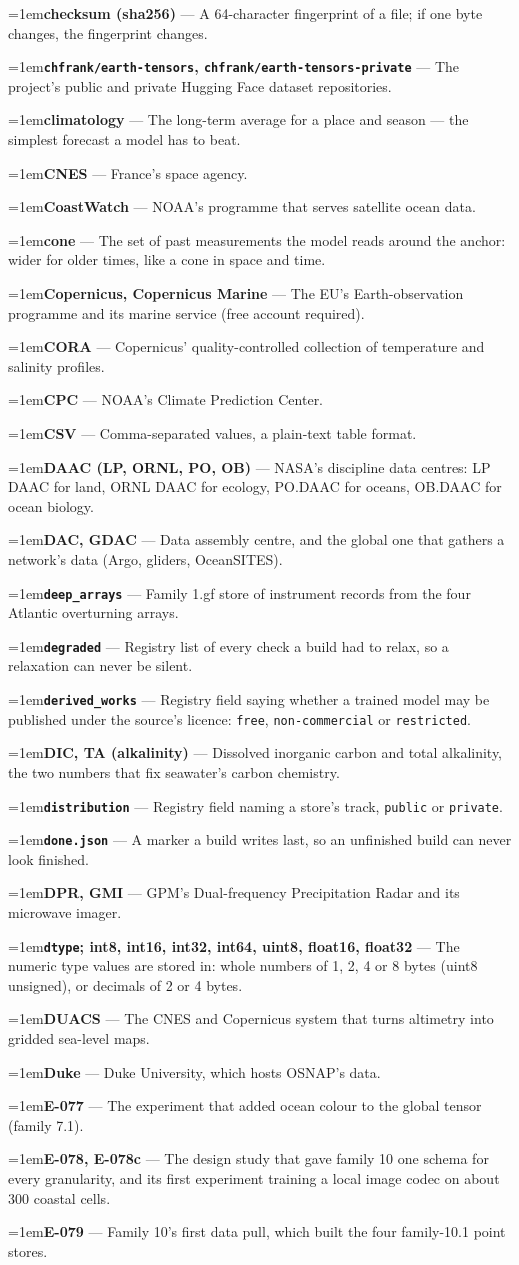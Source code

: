 \documentclass[10pt]{article}
\newcommand{\code}[1]{\texttt{#1}}
\newcommand{\gl}[2]{\par\hangindent=1em\hangafter=1\textbf{#1} --- #2\par}
\begin{document}
\gl{checksum (sha256)}{A 64-character fingerprint of a file; if one byte changes, the fingerprint changes.}
\gl{\code{chfrank/earth-tensors}, \code{chfrank/earth-tensors-private}}{The project's public and private Hugging Face dataset repositories.}
\gl{climatology}{The long-term average for a place and season --- the simplest forecast a model has to beat.}
\gl{CNES}{France's space agency.}
\gl{CoastWatch}{NOAA's programme that serves satellite ocean data.}
\gl{cone}{The set of past measurements the model reads around the anchor: wider for older times, like a cone in space and time.}
\gl{Copernicus, Copernicus Marine}{The EU's Earth-observation programme and its marine service (free account required).}
\gl{CORA}{Copernicus' quality-controlled collection of temperature and salinity profiles.}
\gl{CPC}{NOAA's Climate Prediction Center.}
\gl{CSV}{Comma-separated values, a plain-text table format.}
\gl{DAAC (LP, ORNL, PO, OB)}{NASA's discipline data centres: LP DAAC for land, ORNL DAAC for ecology, PO.DAAC for oceans, OB.DAAC for ocean biology.}
\gl{DAC, GDAC}{Data assembly centre, and the global one that gathers a network's data (Argo, gliders, OceanSITES).}
\gl{\code{deep\_arrays}}{Family 1.gf store of instrument records from the four Atlantic overturning arrays.}
\gl{\code{degraded}}{Registry list of every check a build had to relax, so a relaxation can never be silent.}
\gl{\code{derived\_works}}{Registry field saying whether a trained model may be published under the source's licence: \code{free}, \code{non-commercial} or \code{restricted}.}
\gl{DIC, TA (alkalinity)}{Dissolved inorganic carbon and total alkalinity, the two numbers that fix seawater's carbon chemistry.}
\gl{\code{distribution}}{Registry field naming a store's track, \code{public} or \code{private}.}
\gl{\code{done.json}}{A marker a build writes last, so an unfinished build can never look finished.}
\gl{DPR, GMI}{GPM's Dual-frequency Precipitation Radar and its microwave imager.}
\gl{\code{dtype}; int8, int16, int32, int64, uint8, float16, float32}{The numeric type values are stored in: whole numbers of 1, 2, 4 or 8 bytes (uint8 unsigned), or decimals of 2 or 4 bytes.}
\gl{DUACS}{The CNES and Copernicus system that turns altimetry into gridded sea-level maps.}
\gl{Duke}{Duke University, which hosts OSNAP's data.}
\gl{E-077}{The experiment that added ocean colour to the global tensor (family 7.1).}
\gl{E-078, E-078c}{The design study that gave family 10 one schema for every granularity, and its first experiment training a local image codec on about 300 coastal cells.}
\gl{E-079}{Family 10's first data pull, which built the four family-10.1 point stores.}
\end{document}
